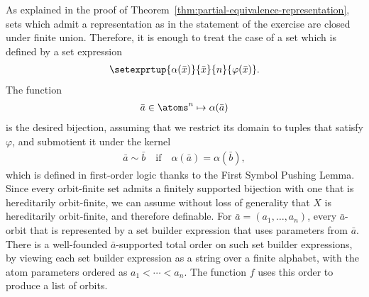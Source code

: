 \exercisepart


{
	As explained in the proof of Theorem~\ref{thm:partial-equivalence-representation}, sets which admit a representation as in the statement of the exercise are closed under finite union. Therefore, it is enough to treat the case of a set which is defined by a set expression 
\begin{align*}
	\setexprtup{\alpha(\bar x)}{\bar x}{n}{\varphi(\bar x)}.
\end{align*}
The function 
\begin{align*}
	\bar a \in \atoms^n \mapsto \alpha(\bar a)
\end{align*}
is the desired bijection, assuming that we restrict its domain to tuples that satisfy $\varphi$, and submotient it under the kernel
\begin{align*}
	\bar a \sim \bar b \quad \text{if} \quad \alpha(\bar a) = \alpha(\bar b),
\end{align*}
which is defined in first-order logic thanks to the First Symbol Pushing Lemma. 
}
{
Since every orbit-finite set admits a finitely supported bijection with one that is hereditarily orbit-finite, we can assume without loss of generality that $X$ is hereditarily orbit-finite, and therefore definable. For $\bar a = (a_1,\ldots,a_n)$, every $\bar a$-orbit that is represented by a set builder expression that uses parameters from $\bar a$. There is a well-founded $\bar a$-supported total order on such set builder expressions, by viewing each set builder expression as a string over a finite alphabet, with the atom parameters ordered as $a_1 < \cdots < a_n$. The function $f$ uses this order to produce a list of orbits.
}